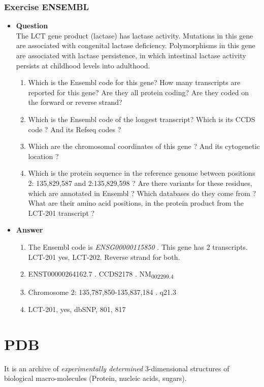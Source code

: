\documentclass[11pt]{article}
\begin{document}
\subsubsection{Exercise ENSEMBL}
\label{sec:org7a869a2}
\begin{itemize}
\item \textbf{Question}\\
The LCT gene product (lactase) has lactase activity. Mutations in this gene
are associated with congenital lactase deficiency. Polymorphisms in this
gene are associated with lactase persistence, in which intestinal lactase
activity persists at childhood levels into adulthood.
\begin{enumerate}
\item Which is the Ensembl code for this gene? How many transcripts are reported
for this gene? Are they all protein coding? Are they coded on the forward
or reverse strand?
\item Which is the Ensembl code of the longest transcript? Which is its CCDS code
? And its Refseq codes ?
\item Which are the chromosomal coordinates of this gene ? And its cytogenetic
location ?
\item Which is the protein sequence in the reference genome between positions 2: 135,829,587  and 2:135,829,598 ? Are there variants for these residues,
which are annotated in Ensembl ? Which databases do they come from ? What
are their amino acid positions, in the protein product from the LCT-201
transcript ?
\end{enumerate}

\item \textbf{Answer}\\
\begin{enumerate}
\item The Ensembl code is \emph{ENSG00000115850} . This gene has 2 transcripts.
LCT-201 yes, LCT-202. Reverse strand for both.

\item ENST00000264162.7 . CCDS2178 . NM\textsubscript{002299.4}

\item Chromosome 2: 135,787,850-135,837,184 . q21.3

\item LCT-201, yes, dbSNP, 801, 817
\end{enumerate}
\end{itemize}


\section{PDB}
\label{sec:org23d3916}
It is an archive of \emph{experimentally determined} 3-dimensional structures of biological 
macro-molecules (Protein, nucleic acids, sugars).
\end{document}
